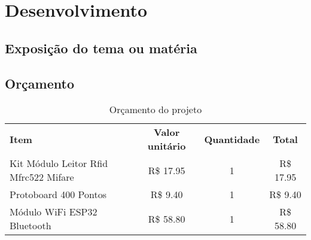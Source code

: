 \chapter{Desenvolvimento}\label{cap:desenvolvimento}

\section{Exposição do tema ou matéria}


\section{Orçamento}

\begin{table}[htb]
	\ABNTEXfontereduzida
	\caption{\label{tab:orçamento}Orçamento do projeto}
    \centering
	\begin{tabular}{lccc} 
		\toprule
		\textbf{Item} & \textbf{Valor unitário} & \textbf{Quantidade} & \textbf{Total}\\
		Kit Módulo Leitor Rfid Mfrc522 Mifare & R\$ 17.95 & 1 & R\$ 17.95  \\
		Protoboard 400 Pontos                 & R\$ 9.40  & 1 & R\$ 9.40  \\
		Módulo WiFi ESP32 Bluetooth           & R\$ 58.80 & 1 & R\$ 58.80  \\
		\bottomrule
	\end{tabular}
\end{table}